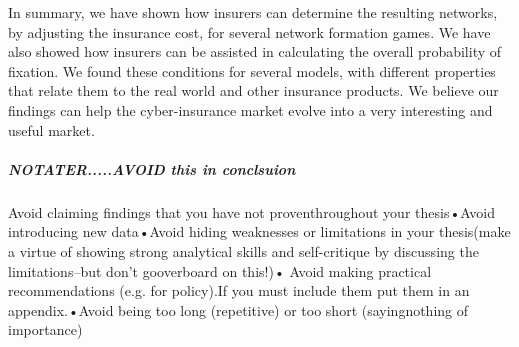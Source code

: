 In summary, we have shown how insurers can determine the resulting networks, by adjusting the insurance cost, for several network formation games. We have also showed how insurers can be assisted in calculating the overall probability of fixation.
We found these conditions for several models, with different properties that relate them to the real world and other insurance products. We believe our findings can help the cyber-insurance market evolve into a very interesting and useful market.


\subparagraph{NOTATER.....AVOID this in conclsuion}
Avoid claiming findings that you have not proventhroughout your thesis•Avoid introducing new data•Avoid hiding weaknesses or limitations in your thesis(make a virtue of showing strong analytical skills and self-critique by discussing the limitations--but don’t gooverboard on this!)• Avoid making practical recommendations (e.g. for policy).If you must include them put them in an appendix.•Avoid being too long (repetitive) or too short (sayingnothing of importance)
